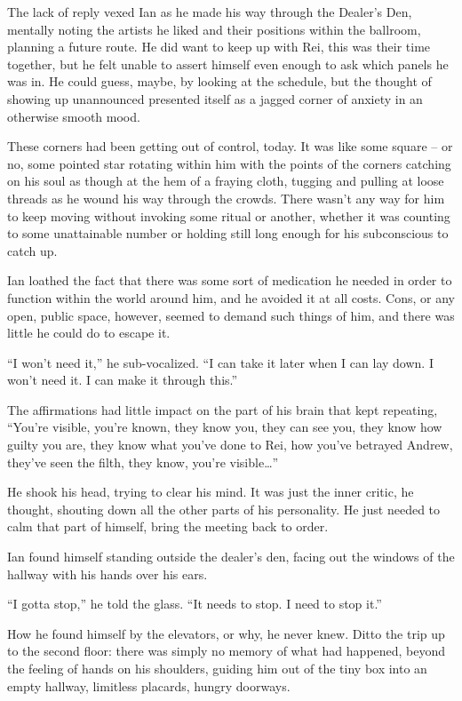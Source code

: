 The lack of reply vexed Ian as he made his way through the Dealer's Den, mentally noting the artists he liked and their positions within the ballroom, planning a future route. He did want to keep up with Rei, this was their time together, but he felt unable to assert himself even enough to ask which panels he was in. He could guess, maybe, by looking at the schedule, but the thought of showing up unannounced presented itself as a jagged corner of anxiety in an otherwise smooth mood.

These corners had been getting out of control, today. It was like some square -- or no, some pointed star rotating within him with the points of the corners catching on his soul as though at the hem of a fraying cloth, tugging and pulling at loose threads as he wound his way through the crowds. There wasn't any way for him to keep moving without invoking some ritual or another, whether it was counting to some unattainable number or holding still long enough for his subconscious to catch up.

Ian loathed the fact that there was some sort of medication he needed in order to function within the world around him, and he avoided it at all costs. Cons, or any open, public space, however, seemed to demand such things of him, and there was little he could do to escape it.

``I won't need it,'' he sub-vocalized. ``I can take it later when I can lay down. I won't need it. I can make it through this.''

The affirmations had little impact on the part of his brain that kept repeating, ``You're visible, you're known, they know you, they can see you, they know how guilty you are, they know what you've done to Rei, how you've betrayed Andrew, they've seen the filth, they know, you're visible\ldots{}''

He shook his head, trying to clear his mind.  It was just the inner critic, he thought, shouting down all the other parts of his personality.  He just needed to calm that part of himself, bring the meeting back to order.

Ian found himself standing outside the dealer's den, facing out the windows of the hallway with his hands over his ears.

``I gotta stop,'' he told the glass. ``It needs to stop. I need to stop it.''

How he found himself by the elevators, or why, he never knew. Ditto the trip up to the second floor: there was simply no memory of what had happened, beyond the feeling of hands on his shoulders, guiding him out of the tiny box into an empty hallway, limitless placards, hungry doorways.

